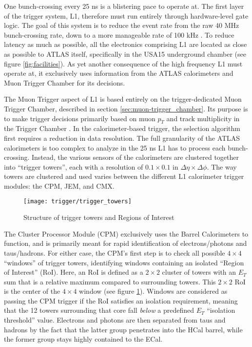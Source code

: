         One bunch-crossing every 25 ns is a blistering pace to operate at.
        The first layer of the trigger system, L1, therefore must run entirely through hardware-level gate logic.
        The goal of this system is to reduce the event rate from the raw 40 MHz bunch-crossing rate, down to a more manageable rate of 100 kHz \cite{trigger_run2}.
        To reduce latency as much as possible, all the electronics comprising L1 are located as close as possible to ATLAS itself, specifically in the USA15 underground chamber \cite{trigger_tdr} (see figure \ref{fig:facilities}).
        As yet another consequence of the high frequency L1 must operate at, it exclusively uses information from the ATLAS calorimeters and Muon Trigger Chamber for its decisions.

        The Muon Trigger aspect of L1 is based entirely on the trigger-dedicated Muon Trigger Chamber, described in section \ref{sec:muon-trigger_chamber}.
        Its purpose is to make trigger decisions primarily based on muon $p_T$ and track multiplicity in the Trigger Chamber \cite{trigger_run1}.
        In the calorimeter-based trigger, the selection algorithm first requires a reduction in data resolution.
        The full granularity of the ATLAS calorimeters is too complex to analyze in the 25 ns L1 has to process each bunch-crossing.
        Instead, the various sensors of the calorimeters are clustered together into ``trigger towers'',
            each with a resolution of $0.1 \times 0.1$ in $\Delta \eta \times \Delta \phi$.
        The way towers are clustered and used varies between the different L1 calorimeter trigger modules: the CPM, JEM, and CMX.

        \begin{figure}[h]
            \texttt{[image: trigger/trigger\_towers]}
            \caption{Structure of trigger towers and Regions of Interest \cite{L1_calo_run1}}
            \label{fig:trigger_towers}
        \end{figure}


        The Cluster Processor Module (CPM) exclusively uses the Barrel Calorimeters to function, and is primarily meant for rapid identification of electrons/photons and taus/hadrons.
        For either case, the CPM's first step is to check all possible $4 \times 4$ ``windows'' of trigger towers, identifying windows containing an isolated ``Region of Interest'' (RoI).
        Here, an RoI is defined as a $2 \times 2$ cluster of towers with an $E_T$ sum that is a relative maximum compared to surrounding towers.
        This $2 \times 2$ RoI is the center of the $4 \times 4$ window (see figure \ref{fig:trigger_towers}).
        Windows are considered as passing the CPM trigger if the RoI satisfies an isolation requirement, meaning that the 12 towers surrounding that core fall \textit{below} a predefined $E_T$ ``isolation threshold'' value.
        Electrons and photons are then separated from taus and hadrons by the fact that the latter group penetrates into the HCal barrel, while the former group stays highly contained to the ECal.

